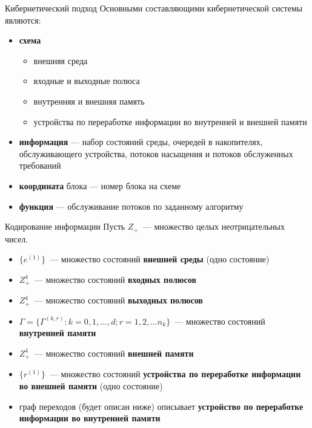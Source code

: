 \documentclass[10pt]{beamer}
\begin{document}
\begin{frame}[allowframebreaks]{Кибернетический подход}
Основными составляющими кибернетической системы являются:
  \begin{itemize}
  \item \textbf{схема}
  \begin{itemize}
      \item внешняя среда
      \item входные и выходные полюса
      \item внутренняя и внешняя память
      \item устройства по переработке информации во внутренней и внешней памяти
      \end{itemize}
  \item \textbf{информация} --- набор состояний среды, очередей в накопителях, обслуживающего устройства, потоков насыщения и потоков обслуженных требований
  \item \textbf{координата} блока --- номер блока на схеме
  \item \textbf{функция} --- обслуживание потоков по заданному алгоритму
  \end{itemize}

\end{frame}

\begin{frame}{Кодирование информации}
Пусть $Z_+$~--- множество целых неотрицательных чисел.
  \begin{itemize}
  \item $\{e^{(1)}\}$~--- множество состояний \textbf{внешней среды} (одно состояние)
  \item $Z_+^4$~--- множество состояний \textbf{входных полюсов}
  \item $Z_+^4$~--- множество состояний \textbf{выходных полюсов}
  \item $\Gamma=\{\Gamma^{(k,r)} \colon k=0,1,\ldots,d; r=1,2,\ldots n_k\}$~--- множество состояний \textbf{внутренней памяти}
  \item $Z_+^4$~--- множество состояний \textbf{внешней памяти}
  \item $\{r^{(1)}\}$~--- множество состояний \textbf{устройства по переработке информации во внешней памяти} (одно состояние)
  \item граф переходов (будет описан ниже) описывает \textbf{устройство по переработке информации во внутренней памяти}
  \end{itemize}
\end{frame}
\end{document}
